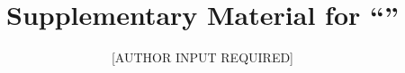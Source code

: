 \documentclass[11pt]{article}
\begin{document}
\title{Supplementary Material for ``\PaperTitle''}
\author{[AUTHOR INPUT REQUIRED]}
\date{}
\maketitle


\end{document}
